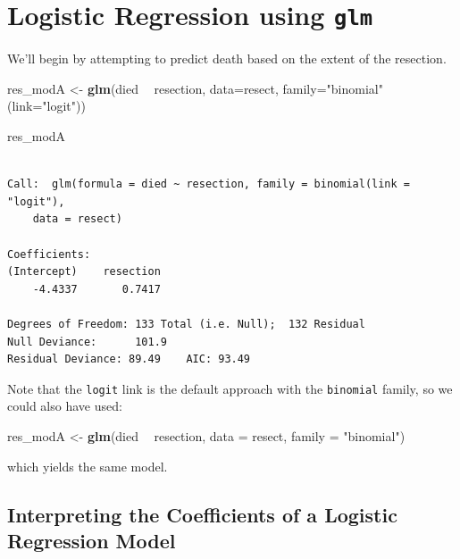 \documentclass[]{book}
\newenvironment{Shaded}{\begin{snugshade}}{\end{snugshade}}
\newcommand{\KeywordTok}[1]{\textcolor[rgb]{0.13,0.29,0.53}{\textbf{#1}}}
\newcommand{\DataTypeTok}[1]{\textcolor[rgb]{0.13,0.29,0.53}{#1}}
\newcommand{\StringTok}[1]{\textcolor[rgb]{0.31,0.60,0.02}{#1}}
\newcommand{\OperatorTok}[1]{\textcolor[rgb]{0.81,0.36,0.00}{\textbf{#1}}}
\newcommand{\NormalTok}[1]{#1}
\theoremstyle{definition}
\theoremstyle{definition}
\theoremstyle{definition}
\theoremstyle{remark}
\begin{document}
\section{\texorpdfstring{Logistic Regression using
\texttt{glm}}{Logistic Regression using glm}}\label{logistic-regression-using-glm}

We'll begin by attempting to predict death based on the extent of the
resection.

\begin{Shaded}
\begin{Highlighting}[]
\NormalTok{res_modA <-}\StringTok{ }\KeywordTok{glm}\NormalTok{(died }\OperatorTok{~}\StringTok{ }\NormalTok{resection, }\DataTypeTok{data=}\NormalTok{resect, }
               \DataTypeTok{family=}\StringTok{"binomial"}\NormalTok{(}\DataTypeTok{link=}\StringTok{"logit"}\NormalTok{))}

\NormalTok{res_modA}
\end{Highlighting}
\end{Shaded}

\begin{verbatim}

Call:  glm(formula = died ~ resection, family = binomial(link = "logit"), 
    data = resect)

Coefficients:
(Intercept)    resection  
    -4.4337       0.7417  

Degrees of Freedom: 133 Total (i.e. Null);  132 Residual
Null Deviance:      101.9 
Residual Deviance: 89.49    AIC: 93.49
\end{verbatim}

Note that the \texttt{logit} link is the default approach with the
\texttt{binomial} family, so we could also have used:

\begin{Shaded}
\begin{Highlighting}[]
\NormalTok{res_modA <-}\StringTok{ }\KeywordTok{glm}\NormalTok{(died }\OperatorTok{~}\StringTok{ }\NormalTok{resection, }\DataTypeTok{data =}\NormalTok{ resect, }
                \DataTypeTok{family =} \StringTok{"binomial"}\NormalTok{)}
\end{Highlighting}
\end{Shaded}

which yields the same model.

\subsection{Interpreting the Coefficients of a Logistic Regression
Model}\label{interpreting-the-coefficients-of-a-logistic-regression-model}
\end{document}
